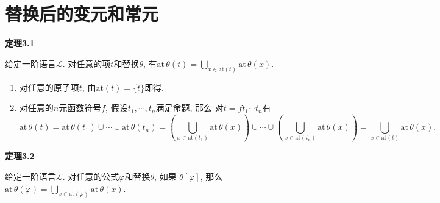 \newpage

\section{替换后的变元和常元}

\hypertarget{sec:定理3.1}{}
\noindent\textbf{定理3.1}

给定一阶语言$\mathcal{L}$. 对任意的项$t$和替换$\theta$, 有$\displaystyle
\mathrm{at}\,\theta(t)=\bigcup_{x\in\mathrm{at}(t)}\mathrm{at}\,\theta(x)$.


\begin{enumerate}
    \item 对任意的原子项$t$, 由$\mathrm{at}(t)=\{t\}$即得.
    \item 对任意的$n$元函数符号$f$, 假设$t_1,\cdots,t_n$满足命题, 那么
    对$t=ft_1\cdots t_n$有
    \vspace{3pt}
    \begin{equation*}
        \mathrm{at}\,\theta(t)=
        \mathrm{at}\,\theta(t_1)\cup\cdots\cup\mathrm{at}\,\theta(t_n)=
        \left(\bigcup_{x\in\mathrm{at}(t_1)}\mathrm{at}\,\theta(x)\right)\cup\cdots
        \cup\left(\bigcup_{x\in\mathrm{at}(t_n)}\mathrm{at}\,\theta(x)\right)=
        \bigcup_{x\in\mathrm{at}(t)}\mathrm{at}\,\theta(x).
    \tag*{\qedsymbol}\end{equation*}
\end{enumerate}

\vspace{10pt}

\hypertarget{sec:定理3.2}{}
\noindent\textbf{定理3.2}

给定一阶语言$\mathcal{L}$. 对任意的公式$\varphi$和替换$\theta$, 如果
$\theta[\varphi]$, 那么$\displaystyle\mathrm{at}\,\theta(\varphi)=
\bigcup_{x\in\mathrm{at}(\varphi)}\mathrm{at}\,\theta(x)$.


